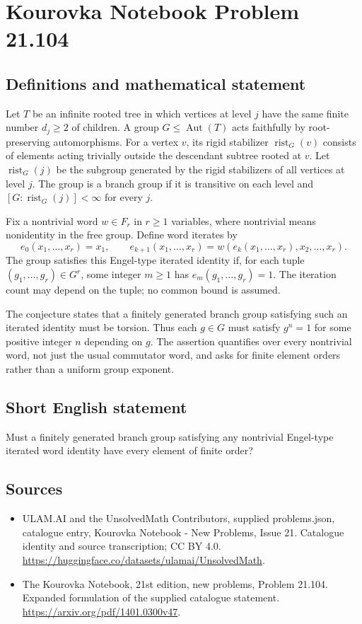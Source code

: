 \documentclass[11pt,a4paper]{article}
\begin{document}
\section*{Kourovka Notebook Problem 21.104}\label{statement}

\subsection{Definitions and mathematical statement}
Let $T$ be an infinite rooted tree in which vertices at level $j$ have the same finite number $d_j\ge2$ of children. A group $G\le\operatorname{Aut}(T)$ acts faithfully by root-preserving automorphisms. For a vertex $v$, its rigid stabilizer $\operatorname{rist}_G(v)$ consists of elements acting trivially outside the descendant subtree rooted at $v$. Let $\operatorname{rist}_G(j)$ be the subgroup generated by the rigid stabilizers of all vertices at level $j$. The group is a branch group if it is transitive on each level and $[G:\operatorname{rist}_G(j)]<\infty$ for every $j$.

Fix a nontrivial word $w\in F_r$ in $r\ge1$ variables, where nontrivial means nonidentity in the free group. Define word iterates by
\[
 e_0(x_1,\ldots,x_r)=x_1,\qquad
 e_{k+1}(x_1,\ldots,x_r)
 =w(e_k(x_1,\ldots,x_r),x_2,\ldots,x_r).
\]
The group satisfies this Engel-type iterated identity if, for each tuple $(g_1,\ldots,g_r)\in G^r$, some integer $m\ge1$ has $e_m(g_1,\ldots,g_r)=1$. The iteration count may depend on the tuple; no common bound is assumed.

The conjecture states that a finitely generated branch group satisfying such an iterated identity must be torsion. Thus each $g\in G$ must satisfy $g^n=1$ for some positive integer $n$ depending on $g$. The assertion quantifies over every nontrivial word, not just the usual commutator word, and asks for finite element orders rather than a uniform group exponent.
\subsection{Short English statement}
Must a finitely generated branch group satisfying any nontrivial Engel-type iterated word identity have every element of finite order?
\subsection{Sources}
\begin{itemize}
\item[S1] ULAM.AI and the UnsolvedMath Contributors, supplied problems.json, catalogue entry, Kourovka Notebook - New Problems, Issue 21. Catalogue identity and source transcription; CC BY 4.0.
\url{https://huggingface.co/datasets/ulamai/UnsolvedMath}.
\item[S2] The Kourovka Notebook, 21st edition, new problems, Problem 21.104. Expanded formulation of the supplied catalogue statement.
\url{https://arxiv.org/pdf/1401.0300v47}.
\end{itemize}
\end{document}
